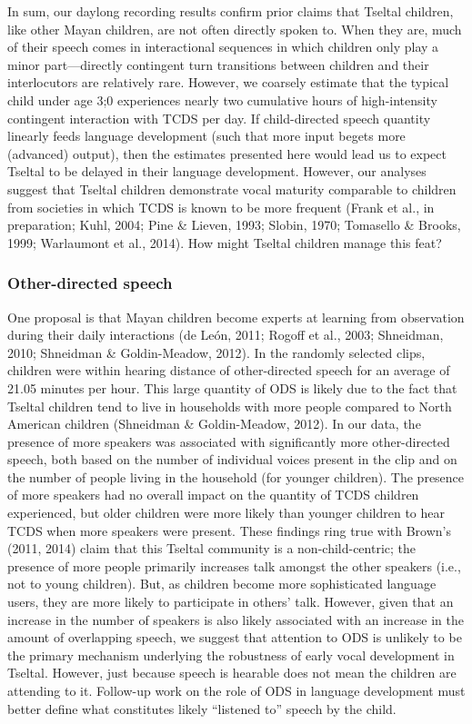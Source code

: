 \documentclass[floatsintext,man]{apa6}
\theoremstyle{definition}
\theoremstyle{definition}
\theoremstyle{definition}
\theoremstyle{remark}
\begin{document}
In sum, our daylong recording results confirm prior claims that Tseltal
children, like other Mayan children, are not often directly spoken to.
When they are, much of their speech comes in interactional sequences in
which children only play a minor part---directly contingent turn
transitions between children and their interlocutors are relatively
rare. However, we coarsely estimate that the typical child under age 3;0
experiences nearly two cumulative hours of high-intensity contingent
interaction with TCDS per day. If child-directed speech quantity
linearly feeds language development (such that more input begets more
(advanced) output), then the estimates presented here would lead us to
expect Tseltal to be delayed in their language development. However, our
analyses suggest that Tseltal children demonstrate vocal maturity
comparable to children from societies in which TCDS is known to be more
frequent (Frank et al., in preparation; Kuhl, 2004; Pine \& Lieven,
1993; Slobin, 1970; Tomasello \& Brooks, 1999; Warlaumont et al., 2014).
How might Tseltal children manage this feat?

\subsubsection{Other-directed speech}\label{other-directed-speech}

One proposal is that Mayan children become experts at learning from
observation during their daily interactions (de León, 2011; Rogoff et
al., 2003; Shneidman, 2010; Shneidman \& Goldin-Meadow, 2012). In the
randomly selected clips, children were within hearing distance of
other-directed speech for an average of 21.05 minutes per hour. This
large quantity of ODS is likely due to the fact that Tseltal children
tend to live in households with more people compared to North American
children (Shneidman \& Goldin-Meadow, 2012). In our data, the presence
of more speakers was associated with significantly more other-directed
speech, both based on the number of individual voices present in the
clip and on the number of people living in the household (for younger
children). The presence of more speakers had no overall impact on the
quantity of TCDS children experienced, but older children were more
likely than younger children to hear TCDS when more speakers were
present. These findings ring true with Brown's (2011, 2014) claim that
this Tseltal community is a non-child-centric; the presence of more
people primarily increases talk amongst the other speakers (i.e., not to
young children). But, as children become more sophisticated language
users, they are more likely to participate in others' talk. However,
given that an increase in the number of speakers is also likely
associated with an increase in the amount of overlapping speech, we
suggest that attention to ODS is unlikely to be the primary mechanism
underlying the robustness of early vocal development in Tseltal.
However, just because speech is hearable does not mean the children are
attending to it. Follow-up work on the role of ODS in language
development must better define what constitutes likely \enquote{listened
to} speech by the child.
\end{document}
